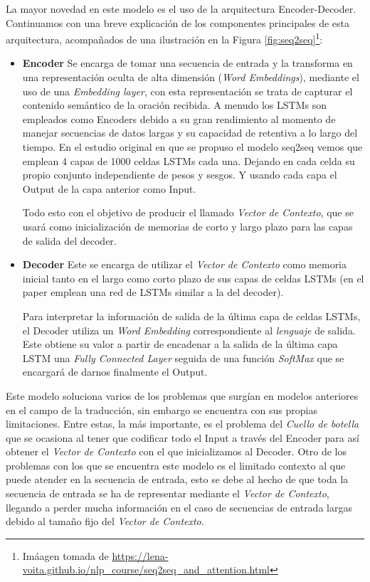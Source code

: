La mayor novedad en este modelo es el uso de la arquitectura Encoder-Decoder. Continuamos con una breve explicación de los componentes principales de esta arquitectura, acompañados de una ilustración en la Figura \ref{fig:seq2seq}\footnote{Imáagen tomada de \url{https://lena-voita.github.io/nlp_course/seq2seq_and_attention.html}}:

\begin{itemize}
	\item \textbf{Encoder} Se encarga de tomar una secuencia de entrada y la transforma en una representación oculta de alta dimensión (\textit{Word Embeddings}), mediante el uso de una \textit{Embedding layer}, con esta representación se trata de capturar el contenido semántico de la oración recibida. A menudo los LSTMs son empleados como Encoders debido a su gran rendimiento al momento de manejar secuencias de datos largas y su capacidad de retentiva a lo largo del tiempo. En el estudio original \citep{sutskever2014sequence} en que se propuso el modelo seq2seq vemos que emplean 4 capas de 1000 celdas LSTMs cada una. Dejando en cada celda su propio conjunto independiente de pesos y sesgos. Y usando cada capa el Output de la capa anterior como Input.

Todo esto con el objetivo de producir el llamado \textit{Vector de Contexto}, que se usará como inicialización de memorias de corto y largo plazo para las capas de salida del decoder.

	\item \textbf{Decoder} Este se encarga de utilizar el \textit{Vector de Contexto} como memoria inicial tanto en el largo como corto plazo de sus capas de celdas LSTMs (en el paper \cite{sutskever2014sequence} emplean una red de LSTMs similar a la del decoder).

Para interpretar la información de salida de la última capa de celdas LSTMs, el Decoder utiliza un \textit{Word Embedding} correspondiente al \textit{lenguaje} de salida. Este obtiene su valor a partir de encadenar a la salida de la última capa LSTM una \textit{Fully Connected Layer} seguida de una función \textit{SoftMax} que se encargará de darnos finalmente el Output.

\end{itemize}

Este modelo soluciona varios de los problemas que surgían en modelos anteriores en el campo de la traducción, sin embargo se encuentra con sus propias limitaciones. Entre estas, la más importante, es el problema del \textit{Cuello de botella} que se ocasiona al tener que codificar todo el Input a través del Encoder para así obtener el \textit{Vector de Contexto} con el que inicializamos al Decoder. Otro de los problemas con los que se encuentra este modelo es el limitado contexto al que puede atender en la secuencia de entrada, esto se debe al hecho de que toda la secuencia de entrada se ha de representar mediante el \textit{Vector de Contexto}, llegando a perder mucha información en el caso de secuencias de entrada largas debido al tamaño fijo del \textit{Vector de Contexto}.

